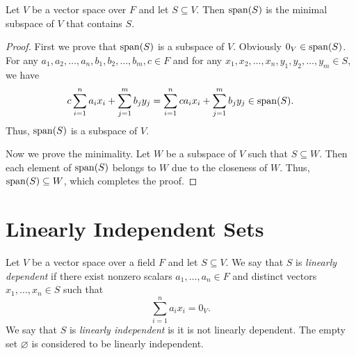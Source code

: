 \begin{theorem}
  \label{thm:span}
  Let $V$ be a vector space over $F$ and let $S \subseteq V$.
  Then $\operatorname{span}(S)$ is the minimal subspace of $V$ that contains $S$.
\end{theorem}
\begin{proof}
  First we prove that $\operatorname{span}(S)$ is a subspace of $V$.
  Obviously $0_V \in \operatorname{span}(S)$.
  For any $a_1, a_2, \dots, a_n, b_1, b_2, \dots, b_m, c \in F$ and
  for any $x_1, x_2, \dots, x_n, y_1, y_2, \dots, y_m \in S$, we have
  \begin{equation*}
    c\sum_{i=1}^n a_ix_i + \sum_{j=1}^m b_jy_j
    = \sum_{i=1}^n ca_ix_i + \sum_{j=1}^m b_jy_j
    \in \operatorname{span}(S).
  \end{equation*}
  Thus, $\operatorname{span}(S)$ is a subspace of $V$.

  Now we prove the minimality.
  Let $W$ be a subspace of $V$ such that $S \subseteq W$.
  Then each element of $\operatorname{span}(S)$ belongs to $W$ due to the closeness of $W$.
  Thus, $\operatorname{span}(S) \subseteq W$, which completes the proof.
\end{proof}

\section{Linearly Independent Sets}
\begin{definition}
  \label{def:linear-independence}
  Let $V$ be a vector space over a field $F$ and let $S \subseteq V$.
  We say that $S$ is \emph{linearly dependent} if there exist nonzero scalars
  $a_1, \dots, a_n \in F$ and distinct vectors $x_1, \dots, x_n \in S$ such
  that
  \begin{equation*}
    \sum_{i=1}^n a_ix_i = 0_V.
  \end{equation*}
  We say that $S$ is \emph{linearly independent} is it is not linearly
  dependent.
  The empty set $\varnothing$ is considered to be linearly independent.
\end{definition}


